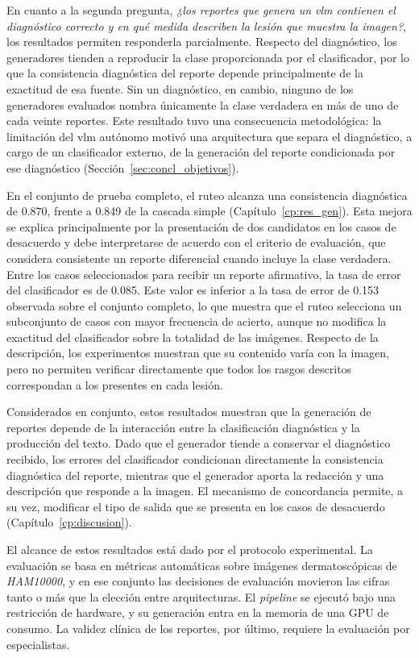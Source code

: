 En cuanto a la segunda pregunta, \emph{¿los reportes que genera un \gls{vlm} contienen el diagnóstico correcto y en qué medida describen la lesión que muestra la imagen?}, los resultados permiten responderla parcialmente. Respecto del diagnóstico, los generadores tienden a reproducir la clase proporcionada por el clasificador, por lo que la consistencia diagnóstica del reporte depende principalmente de la exactitud de esa fuente. Sin un diagnóstico, en cambio, ninguno de los generadores evaluados nombra únicamente la clase verdadera en más de uno de cada veinte reportes. Este resultado tuvo una consecuencia metodológica: la limitación del \gls{vlm} autónomo motivó una arquitectura que separa el diagnóstico, a cargo de un clasificador externo, de la generación del reporte condicionada por ese diagnóstico (Sección~\ref{sec:concl_objetivos}).

En el conjunto de prueba completo, el ruteo alcanza una consistencia diagnóstica de 0.870, frente a 0.849 de la cascada simple (Capítulo~\ref{cp:res_gen}). Esta mejora se explica principalmente por la presentación de dos candidatos en los casos de desacuerdo y debe interpretarse de acuerdo con el criterio de evaluación, que considera consistente un reporte diferencial cuando incluye la clase verdadera. Entre los casos seleccionados para recibir un reporte afirmativo, la tasa de error del clasificador es de 0.085. Este valor es inferior a la tasa de error de 0.153 observada sobre el conjunto completo, lo que muestra que el ruteo selecciona un subconjunto de casos con mayor frecuencia de acierto, aunque no modifica la exactitud del clasificador sobre la totalidad de las imágenes. Respecto de la descripción, los experimentos muestran que su contenido varía con la imagen, pero no permiten verificar directamente que todos los rasgos descritos correspondan a los presentes en cada lesión.

Considerados en conjunto, estos resultados muestran que la generación de reportes depende de la interacción entre la clasificación diagnóstica y la producción del texto. Dado que el generador tiende a conservar el diagnóstico recibido, los errores del clasificador condicionan directamente la consistencia diagnóstica del reporte, mientras que el generador aporta la redacción y una descripción que responde a la imagen. El mecanismo de concordancia permite, a su vez, modificar el tipo de salida que se presenta en los casos de desacuerdo (Capítulo~\ref{cp:discusion}).

El alcance de estos resultados está dado por el protocolo experimental. La evaluación se basa en métricas automáticas sobre imágenes dermatoscópicas de \emph{HAM10000}, y en ese conjunto las decisiones de evaluación movieron las cifras tanto o más que la elección entre arquitecturas. El \emph{pipeline} se ejecutó bajo una restricción de hardware, y su generación entra en la memoria de una GPU de consumo. La validez clínica de los reportes, por último, requiere la evaluación por especialistas.
